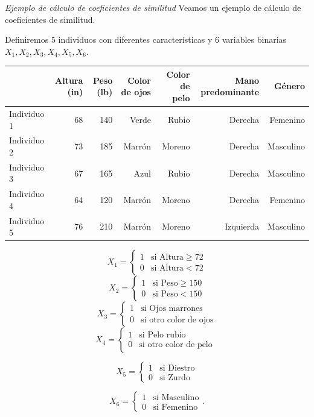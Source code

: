 \documentclass[spanish]{beamer}
\begin{document}
\begin{frame}{\textit{Ejemplo de cálculo de coeficientes de similitud}}
Veamos un ejemplo de cálculo de coeficientes de similitud.\break

Definiremos 5 individuos con diferentes características y 6 variables binarias $X_1,X_2,X_3,X_4,X_5,X_6$.
\begin{table}[h]
  \centering
  \label{tab:ej-similitud}
\resizebox{11cm}{!} {
  \begin{tabular}{lrrrrrr}
    \toprule
            & Altura (in) & Peso (lb) & Color de ojos & Color de pelo & Mano predominante & Género \\ \midrule
Individuo 1 & 68                       & 140                    & Verde                             & Rubio                             & Derecha                               & Femenino\\
Individuo 2 & 73 & 185 & Marrón & Moreno & Derecha & Masculino                  \\
Individuo 3 & 67 & 165 & Azul & Rubio & Derecha & Masculino                  \\
Individuo 4 & 64 & 120 & Marrón & Moreno                            & Derecha & Femenino \\
Individuo 5 & 76 & 210 & Marrón & Moreno & Izquierda & Masculino                 
\end{tabular}
}
\end{table}
\end{frame}

\begin{frame}{}
$$X_1 = \left \{ \begin{matrix} 1 & \mbox{si Altura}  \geq 72 
\\ 0 & \mbox{si Altura}  < 72 \end{matrix}\right.$$
$$X_2 = \left \{ \begin{matrix} 1 & \mbox{si Peso}  \geq 150 
\\ 0 & \mbox{si Peso}  < 150 \end{matrix}\right.   $$
$$X_3 = \left \{ \begin{matrix} 1 & \mbox{si Ojos marrones} 
\\ 0 & \mbox{si otro color de ojos}\end{matrix}\right.   $$
$$X_4 = \left \{ \begin{matrix} 1 & \mbox{si Pelo rubio} 
\\ 0 & \mbox{si otro color de pelo } \end{matrix}\right.   $$

$$X_5 = \left \{ \begin{matrix} 1 & \mbox{si Diestro} 
\\ 0 & \mbox{si Zurdo } \end{matrix}\right.   $$

$$X_6 = \left \{ \begin{matrix} 1 & \mbox{si Masculino} 
\\ 0 & \mbox{si Femenino}  \end{matrix}\right.   .$$
\end{frame}
\end{document}
